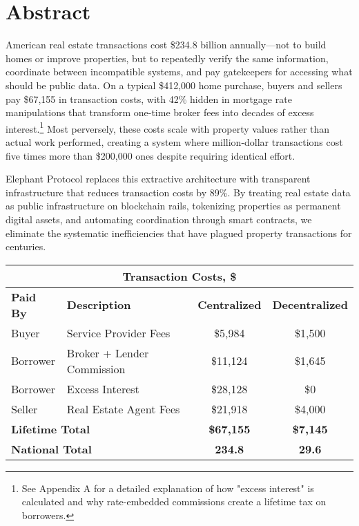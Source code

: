 \chapter{Abstract}

American real estate transactions cost \$234.8 billion annually---not to build homes or improve properties, but to repeatedly verify the same information, coordinate between incompatible systems, and pay gatekeepers for accessing what should be public data. On a typical \$412,000 home purchase, buyers and sellers pay \$67,155 in transaction costs, with 42\% hidden in mortgage rate manipulations that transform one-time broker fees into decades of excess interest.\footnote{See Appendix A for a detailed explanation of how "excess interest" is calculated and why rate-embedded commissions create a lifetime tax on borrowers.} Most perversely, these costs scale with property values rather than actual work performed, creating a system where million-dollar transactions cost five times more than \$200,000 ones despite requiring identical effort.

Elephant Protocol replaces this extractive architecture with transparent infrastructure that reduces transaction costs by 89\%. By treating real estate data as public infrastructure on blockchain rails, tokenizing properties as permanent digital assets, and automating coordination through smart contracts, we eliminate the systematic inefficiencies that have plagued property transactions for centuries.

\begin{center}
\begin{tabular}{llcc}
\hline
\multicolumn{4}{c}{\textbf{Transaction Costs, \$}} \\
\hline
\textbf{Paid By} & \textbf{Description} & \textbf{Centralized} & \textbf{Decentralized} \\
\hline
Buyer & Service Provider Fees & \$5,984 & \$1,500 \\
Borrower & Broker + Lender Commission & \$11,124 & \$1,645 \\
Borrower & Excess Interest & \$28,128 & \$0 \\
Seller & Real Estate Agent Fees & \$21,918 & \$4,000 \\
\hline
\multicolumn{2}{l}{\textbf{Lifetime Total}} & \textbf{\$67,155} & \textbf{\$7,145} \\
\multicolumn{2}{l}{\textbf{National Total}} & \textbf{234.8} & \textbf{29.6} \\
\hline
\end{tabular}
\end{center}

